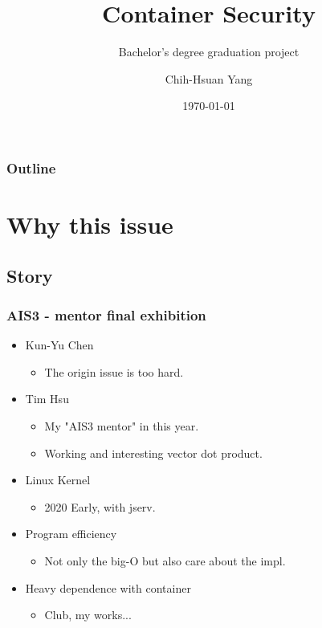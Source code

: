 \documentclass{beamer}
\title{Container Security}
\subtitle{Bachelor's degree graduation project}
\author{Chih-Hsuan Yang}
\institute{National Sun Yat-sen University}
\date{\today}
\begin{document}
\begin{frame}
    \titlepage
\end{frame}

\begin{frame}
    \frametitle{Outline}
    \tableofcontents
\end{frame}

\section{Why this issue}
\subsection{Story}
\begin{frame}
    \frametitle{AIS3 - mentor final exhibition}

    \begin{itemize}
        \item Kun-Yu Chen
              \begin{itemize}
                  \item The origin issue is too hard.
              \end{itemize}
        \item Tim Hsu
              \begin{itemize}
                  \item My "AIS3 mentor" in this year.
                  \item Working and interesting vector dot product.
              \end{itemize}
        \item Linux Kernel
              \begin{itemize}
                  \item 2020 Early, with jserv.
              \end{itemize}
        \item Program efficiency
              \begin{itemize}
                  \item Not only the big-O but also care about the impl.
              \end{itemize}
        \item Heavy dependence with container
              \begin{itemize}
                  \item Club, my works...
              \end{itemize}
    \end{itemize}

\end{frame}
\end{document}
